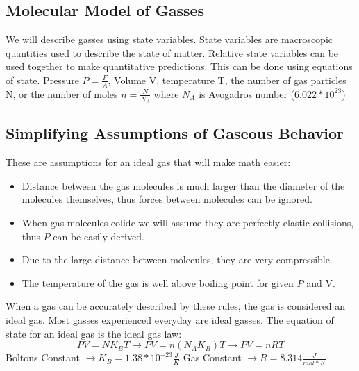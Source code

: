 	\subsection{Molecular Model of Gasses}
	We will describe gasses using state variables. State variables are macroscopic quantities used to describe the state of matter. Relative state variables can be used together to make quantitative predictions. This can be done using equations of state. Pressure $P=\frac{F}{A}$, Volume V, temperature T, the number of gas particles N, or the number of moles $n=\frac{N}{N_A}$ where $N_A$ is Avogadros number ($6.022*10^{23}$)
	\subsection{Simplifying Assumptions of Gaseous Behavior}
	These are assumptions for an ideal gas that will make math easier:
	\begin{itemize}
	\item Distance between the gas molecules is much larger than the diameter of the molecules themselves, thus forces between molecules can be ignored.
	\item When gas molecules colide we will assume they are perfectly elastic collisions, thus $P$ can be easily derived.
	\item Due to the large distance between molecules, they are very compressible.
	\item The temperature of the gas is well above boiling point for given $P$ and V.
	\end{itemize}
	When a gas can be accurately described by these rules, the gas is considered an ideal gas. Most gasses experienced everyday are ideal gasses. The equation of state for an ideal gas is the ideal gas law:
	\begin{equation*}
	PV=NK_BT \to PV=n(N_AK_B)T \to PV=nRT
	\end{equation*}
	Boltons Constant $\to K_B=1.38*10^{-23}\frac{J}{K}$
	\newline Gas Constant $\to R=8.314\frac{J}{mol*K}$
